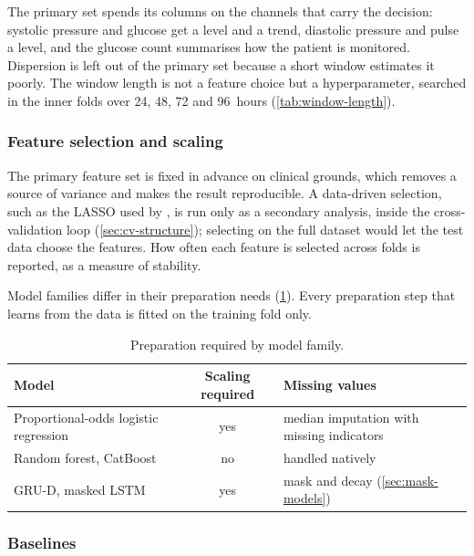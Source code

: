 The primary set spends its columns on the channels that carry the decision: systolic pressure and glucose get a level and a trend, diastolic pressure and pulse a level, and the glucose count summarises how the patient is monitored. Dispersion is left out of the primary set because a short window estimates it poorly. The window length is not a feature choice but a hyperparameter, searched in the inner folds over 24, 48, 72 and 96~hours (\cref{tab:window-length}).

\subsubsection{Feature selection and scaling}\label{sec:selection}\label{sec:nested}\label{sec:scaling}

The primary feature set is fixed in advance on clinical grounds, which removes a source of variance and makes the result reproducible. A data-driven selection, such as the LASSO used by \textcite{mendoza2025}, is run only as a secondary analysis, inside the cross-validation loop (\cref{sec:cv-structure}); selecting on the full dataset would let the test data choose the features. How often each feature is selected across folds is reported, as a measure of stability.

Model families differ in their preparation needs (\cref{tab:model-prep}). Every preparation step that learns from the data is fitted on the training fold only.

\begin{table}[htbp]
\centering\small
\caption{Preparation required by model family.}\label{tab:model-prep}
\begin{tabularx}{\textwidth}{@{}X c X@{}}
\toprule
\textbf{Model} & \textbf{Scaling required} & \textbf{Missing values} \\
\midrule
Proportional-odds logistic regression & yes & median imputation with missing indicators \\
Random forest, CatBoost & no & handled natively \\
GRU-D, masked LSTM & yes & mask and decay (\cref{sec:mask-models}) \\
\bottomrule
\end{tabularx}
\end{table}

\subsubsection{Baselines}\label{sec:baselines}

